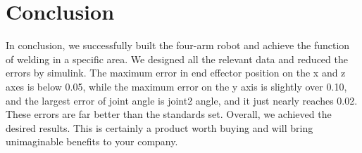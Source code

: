 \vspace{-0.3cm}
\section{Conclusion}

In conclusion, we successfully built the four-arm robot and achieve the function of welding in a specific area. We designed all the relevant data and reduced the errors by simulink. The maximum error in end effector position on the x and z axes is below 0.05, while the maximum error on the y axis is slightly over 0.10, and the largest error of joint angle is joint2 angle, and it just nearly reaches 0.02. These errors are far better than the standards set. Overall, we achieved the desired results. This is certainly a product worth buying and will bring unimaginable benefits to your company.